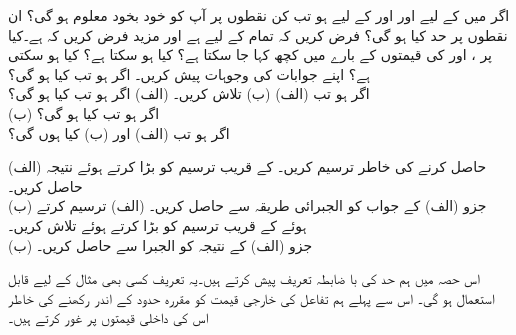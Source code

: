اگر  میں  کے لیے  اور  اور  کے لیے  ہو تب کن نقطوں  پر آپ کو  خود بخود معلوم ہو گی؟ ان نقطوں پر حد کیا ہو گی؟
فرض کریں کہ تمام  کے لیے  ہے اور مزید فرض کریں کہ  ہے۔کیا  پر ،  اور  کی قیمتوں کے بارے میں کچھ کہا جا سکتا ہے؟ کیا  ہو سکتا ہے؟ کیا  ہو سکتی ہے؟ اپنے جوابات کی وجوہات پیش کریں۔
اگر  ہو تب  کیا ہو گی؟\\
اگر  ہو تب (الف)  (ب)  تلاش کریں۔
(الف) \quad
اگر  ہو تب  کیا ہو گی؟\\
(ب) \quad
اگر  ہو تب  کیا ہو گی؟\\
اگر  ہو تب (الف)  اور (ب)  کیا ہوں گی؟


(الف)\quad
{} حاصل کرنے کی خاطر  ترسیم کریں۔  کے قریب ترسیم کو بڑا کرتے ہوئے نتیجہ حاصل کریں۔\\
(ب)\quad
جزو (الف) کے جواب کو الجبرائی طریقہ سے حاصل کریں۔ 
(الف)\quad
{} ترسیم کرتے ہوئے  کے قریب ترسیم کو بڑا کرتے ہوئے  تلاش کریں۔ \\
(ب)\quad
جزو (الف) کے نتیجہ کو الجبرا سے حاصل کریں۔


اس حصہ میں ہم حد کی با ضابطہ تعریف پیش کرتے ہیں۔یہ تعریف کسی بھی مثال کے لیے قابل استعمال ہو گی۔ اس سے پہلے ہم تفاعل کی خارجی قیمت کو مقررہ حدود کے اندر رکھنے کی خاطر اس کی داخلی قیمتوں پر غور کرتے ہیں۔

